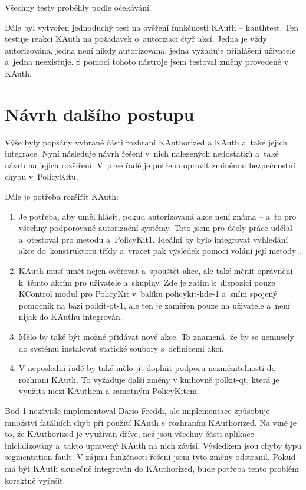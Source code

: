 Všechny testy proběhly podle očekávání.

Dále byl vytvořen jednoduchý test na ověření funkčnosti KAuth -- kauthtest. Ten testuje reakci KAuth na požadavek o~autorizaci čtyř akcí. Jedna je vždy autorizována, jedna není nikdy autorizována, jedna vyžaduje přihlášení uživatele a~jedna neexistuje. S pomocí tohoto nástroje jsem testoval změny provedené v KAuth.

\section{Návrh dalšího postupu}
Výše byly popsány vybrané části rozhraní KAuthorized a KAuth a~také jejich integrace. Nyní následuje návrh řešení v~nich nalezených nedostatků a~také návrh na jejich rozšíření. V~prvé řadě je potřeba opravit zmíněnou bezpečnostní chybu v~PolicyKitu. 

Dále je potřeba rozšířit KAuth:
\begin{enumerate}
\item Je potřeba, aby uměl hlásit, pokud autorizovaná akce není známa -- a~to pro všechny podporované autorizační systémy. Toto jsem pro účely práce udělal a~otestoval pro metodu  a~PolicyKit1. Ideální by bylo integrovat vyhledání akce do~konstruktoru třídy  a~vracet pak výsledek pomocí volání její metody .
\item KAuth musí umět nejen ověřovat a~spouštět akce, ale také měnit oprávnění k~těmto akcím pro uživatele a~skupiny. Zde je zatím k~dispozici pouze KControl modul pro PolicyKit v~balíku policykit-kde-1 a~sním spojený pomocník na bázi polkit-qt-1, ale ten je zaměřen pouze na uživatele a~není nijak do KAuthu integrován.
\item Mělo by také být možné přidávat nové akce. To znamená, že by se nemusely do systému instalovat statické soubory s~definicemi akcí.
\item V neposlední řadě by také mělo jít doplnit podporu nezměnitelnosti do rozhraní KAuth. To vyžaduje další změny v knihovně polkit-qt, která je využita mezi KAuthem a samotným PolicyKitem.
\end{enumerate}

Bod 1 nezávisle implementoval Dario Freddi, ale implementace způsobuje množství fatálních chyb při použití KAuth s~rozhraním KAuthorized. Na vině je to, že KAuthorized je využíván dříve, než jsou všechny části aplikace inicializovány a~takto upravený KAuth na nich závisí. Výsledkem jsou chyby typu segmentation fault. V zájmu funkčnosti řešení jsem tyto změny odstranil. Pokud má být KAuth skutečně integrován do KAuthorized, bude potřeba tento problém korektně vyřešit.

